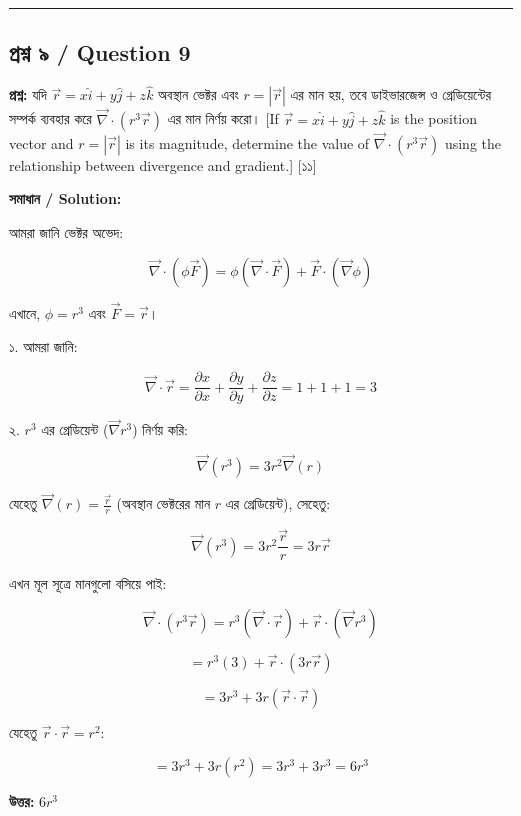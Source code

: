 \documentclass[11pt, a4paper]{article}
\begin{document}
\vspace{1em}
\noindent\rule{\textwidth}{0.4pt}
\vspace{1em}

\subsection*{প্রশ্ন ৯ / Question 9}
\textbf{প্রশ্ন:} যদি $\vec{r} = x\hat{i} + y\hat{j} + z\hat{k}$ অবস্থান ভেক্টর এবং $r = |\vec{r}|$ এর মান হয়, তবে ডাইভারজেন্স ও গ্রেডিয়েন্টের সম্পর্ক ব্যবহার করে $\vec{\nabla} \cdot (r^3\vec{r})$ এর মান নির্ণয় করো। [If $\vec{r} = x\hat{i} + y\hat{j} + z\hat{k}$ is the position vector and $r = |\vec{r}|$ is its magnitude, determine the value of $\vec{\nabla} \cdot (r^3\vec{r})$ using the relationship between divergence and gradient.] [১১]

\vspace{0.8em}
\textbf{সমাধান / Solution:}

আমরা জানি ভেক্টর অভেদ:

$$\vec{\nabla} \cdot (\phi \vec{F}) = \phi (\vec{\nabla} \cdot \vec{F}) + \vec{F} \cdot (\vec{\nabla} \phi)$$

এখানে, $\phi = r^3$ এবং $\vec{F} = \vec{r}$।

১. আমরা জানি:

$$\vec{\nabla} \cdot \vec{r} = \frac{\partial x}{\partial x} + \frac{\partial y}{\partial y} + \frac{\partial z}{\partial z} = 1 + 1 + 1 = 3$$

২. $r^3$ এর গ্রেডিয়েন্ট ($\vec{\nabla} r^3$) নির্ণয় করি:

$$\vec{\nabla}(r^3) = 3r^2 \vec{\nabla}(r)$$

যেহেতু $\vec{\nabla}(r) = \frac{\vec{r}}{r}$ (অবস্থান ভেক্টরের মান $r$ এর গ্রেডিয়েন্ট), সেহেতু:

$$\vec{\nabla}(r^3) = 3r^2 \frac{\vec{r}}{r} = 3r\vec{r}$$

এখন মূল সূত্রে মানগুলো বসিয়ে পাই:

$$\vec{\nabla} \cdot (r^3\vec{r}) = r^3 (\vec{\nabla} \cdot \vec{r}) + \vec{r} \cdot (\vec{\nabla} r^3)$$

$$= r^3 (3) + \vec{r} \cdot (3r\vec{r})$$

$$= 3r^3 + 3r (\vec{r} \cdot \vec{r})$$

যেহেতু $\vec{r} \cdot \vec{r} = r^2$:

$$= 3r^3 + 3r(r^2) = 3r^3 + 3r^3 = 6r^3$$

\textbf{উত্তর:} $6r^3$
\end{document}
